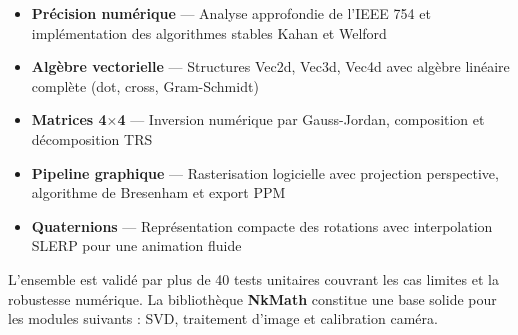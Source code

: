 \documentclass[11pt,a4paper]{article}
\begin{document}
\begin{itemize}[itemsep=5pt]
    \item \textbf{Précision numérique} — Analyse approfondie de l'IEEE 754 et implémentation des algorithmes stables Kahan et Welford
    \item \textbf{Algèbre vectorielle} — Structures Vec2d, Vec3d, Vec4d avec algèbre linéaire complète (dot, cross, Gram-Schmidt)
    \item \textbf{Matrices 4$\times$4} — Inversion numérique par Gauss-Jordan, composition et décomposition TRS
    \item \textbf{Pipeline graphique} — Rasterisation logicielle avec projection perspective, algorithme de Bresenham et export PPM
    \item \textbf{Quaternions} — Représentation compacte des rotations avec interpolation SLERP pour une animation fluide
\end{itemize}

L'ensemble est validé par plus de 40 tests unitaires couvrant les cas limites et la robustesse numérique. La bibliothèque \textbf{NkMath} constitue une base solide pour les modules suivants : SVD, traitement d'image et calibration caméra.
\end{document}
